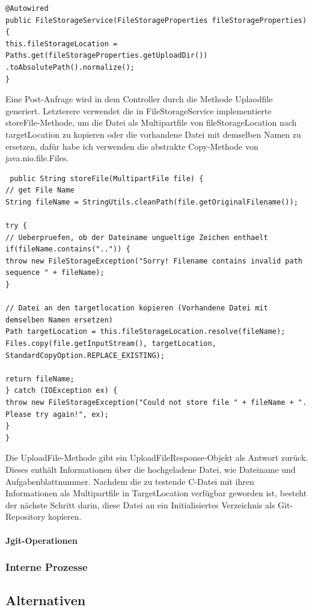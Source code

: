 \documentclass[apaper4,12p]{scrartcl}
\begin{document}
\begin{lstlisting}
@Autowired
public FileStorageService(FileStorageProperties fileStorageProperties) {
this.fileStorageLocation = Paths.get(fileStorageProperties.getUploadDir())
.toAbsolutePath().normalize();
}
\end{lstlisting}
Eine Post-Anfrage wird in dem Controller durch die Methode Uplaodfile generiert. Letzterere verwendet die in FileStorageService implementierte storeFile-Methode, um die Datei als Multipartfile  von fileStorageLocation nach targetLocation zu kopieren oder die vorhandene Datei mit demselben Namen zu ersetzen, dafür habe ich verwenden die abstrakte  Copy-Methode von java.nio.file.Files.
\begin{lstlisting}
 public String storeFile(MultipartFile file) {
// get File Name
String fileName = StringUtils.cleanPath(file.getOriginalFilename());

try {
// Ueberpruefen, ob der Dateiname ungueltige Zeichen enthaelt
if(fileName.contains("..")) {
throw new FileStorageException("Sorry! Filename contains invalid path sequence " + fileName);
}

// Datei an den targetlocation kopieren (Vorhandene Datei mit demselben Namen ersetzen)
Path targetLocation = this.fileStorageLocation.resolve(fileName);
Files.copy(file.getInputStream(), targetLocation, StandardCopyOption.REPLACE_EXISTING);

return fileName;
} catch (IOException ex) {
throw new FileStorageException("Could not store file " + fileName + ". Please try again!", ex);
}
}
\end{lstlisting}
Die UploadFile-Methode gibt ein UploadFileResponse-Objekt als Antwort zurück. Dieses enthält Informationen über die hochgeladene Datei, wie Dateiname und Aufgabenblattnummer.
\newline
Nachdem die zu testende C-Datei mit ihren Informationen als Multipartfile in TargetLocation verfügbar geworden ist, besteht der nächste Schritt darin, diese Datei an ein Initialisiertes Verzeichnis als Git-Repository kopieren.

\paragraph{Jgit-Operationen}


\subsubsection{Interne Prozesse}
\subsection{Alternativen}
\end{document}
